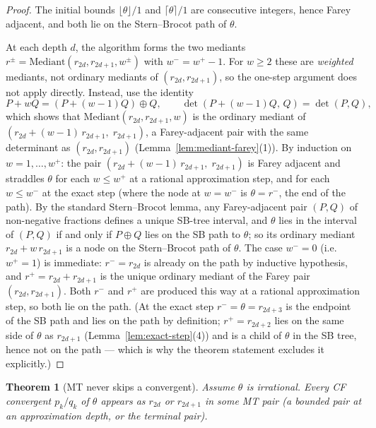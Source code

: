 \documentclass[12pt]{article}
\newtheorem{theorem}{Theorem}[section]
\theoremstyle{definition}
\theoremstyle{remark}
\theoremstyle{plain}
\begin{document}
\begin{proof}
The initial bounds $\lfloor\theta\rfloor/1$ and $\lceil\theta\rceil/1$ are
consecutive integers, hence Farey adjacent, and both lie on the Stern--Brocot
path of $\theta$.

At each depth $d$, the algorithm forms the two mediants
$r^\pm = \mathrm{Mediant}(r_{2d}, r_{2d+1}, w^\pm)$ with $w^- = w^+ - 1$.
For $w \geq 2$ these are \emph{weighted} mediants, not ordinary mediants of
$(r_{2d}, r_{2d+1})$, so the one-step argument does not apply directly.
Instead, use the identity
\[
  P + w Q = (P + (w-1)Q) \oplus Q,
  \qquad
  \det(P+(w-1)Q,\, Q) = \det(P, Q),
\]
which shows that $\mathrm{Mediant}(r_{2d}, r_{2d+1}, w)$ is the ordinary mediant of
$(r_{2d} + (w-1)\,r_{2d+1},\; r_{2d+1})$, a Farey-adjacent pair with the same
determinant as $(r_{2d}, r_{2d+1})$ (Lemma~\ref{lem:mediant-farey}(1)).
By induction on $w = 1, \ldots, w^+$: the pair
$(r_{2d} + (w-1)\,r_{2d+1},\; r_{2d+1})$ is Farey adjacent and straddles
$\theta$ for each $w \leq w^+$ at a rational approximation step, and for each $w \leq w^-$ at the
exact step (where the node at $w = w^-$ is $\theta = r^-$, the end of the path).
By the standard Stern--Brocot lemma, any Farey-adjacent pair $(P, Q)$ of
non-negative fractions defines a unique SB-tree interval, and $\theta$
lies in the interval of $(P, Q)$ if and only if $P \oplus Q$ lies on the
SB path to $\theta$; so its ordinary mediant
$r_{2d} + w\,r_{2d+1}$ is a node on the Stern--Brocot path of $\theta$.
The case $w^- = 0$ (i.e.\ $w^+ = 1$) is immediate: $r^- = r_{2d}$ is
already on the path by inductive hypothesis, and $r^+ = r_{2d} + r_{2d+1}$
is the unique ordinary mediant of the Farey pair $(r_{2d}, r_{2d+1})$.
Both $r^-$ and $r^+$ are produced this way at a rational approximation step, so both lie on the path.
(At the exact step $r^- = \theta = r_{2d+3}$ is the endpoint of the SB path and lies on
the path by definition; $r^+ = r_{2d+2}$ lies on the same side of $\theta$ as $r_{2d+1}$
(Lemma~\ref{lem:exact-step}(4)) and is a child of $\theta$ in the SB tree, hence not on
the path --- which is why the theorem statement excludes it explicitly.)
\end{proof}

\begin{theorem}[MT never skips a convergent]
\label{thm:never-skips}
  Assume $\theta$ is irrational.
  Every CF convergent $p_k/q_k$ of $\theta$ appears as $r_{2d}$ or $r_{2d+1}$
  in some MT pair (a bounded pair at an approximation depth, or the terminal pair).
\end{theorem}
\end{document}
